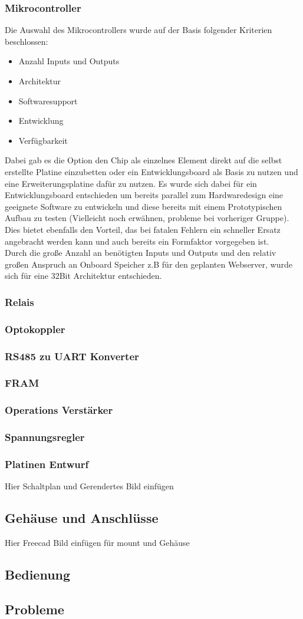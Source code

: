 \subsubsection{Mikrocontroller}
Die Auswahl des Mikrocontrollers wurde auf der Basis folgender Kriterien beschlossen:
\begin{itemize}
	\item Anzahl Inputs und Outputs
	\item Architektur
	\item Softwaresupport
	\item Entwicklung
	\item Verfügbarkeit
\end{itemize}
Dabei gab es die Option den Chip als einzelnes Element direkt auf die selbst erstellte Platine einzubetten oder ein Entwicklungsboard als Basis zu nutzen und eine Erweiterungsplatine dafür zu nutzen. Es wurde sich dabei für ein Entwicklungsboard entschieden um bereits parallel zum Hardwaredesign eine geeignete Software zu entwickeln und diese bereits mit einem Prototypischen Aufbau zu testen (Vielleicht noch erwähnen, probleme bei vorheriger Gruppe). Dies bietet ebenfalls den Vorteil, das bei fatalen Fehlern ein schneller Ersatz angebracht werden kann und auch bereits ein Formfaktor vorgegeben ist.\\

Durch die große Anzahl an benötigten Inputs und Outputs und den relativ großen Anspruch an Onboard Speicher z.B für den geplanten Webserver, wurde sich für eine 32Bit Architektur entschieden.
\subsubsection{Relais}
\subsubsection{Optokoppler}
\subsubsection{RS485 zu UART Konverter}
\subsubsection{FRAM}
\subsubsection{Operations Verstärker}
\subsubsection{Spannungsregler}
\subsubsection{Platinen Entwurf}
Hier Schaltplan und Gerendertes Bild einfügen
\subsection{Gehäuse und Anschlüsse}
Hier Freecad Bild einfügen für mount und Gehäuse
\subsection{Bedienung}
\subsection{Probleme}